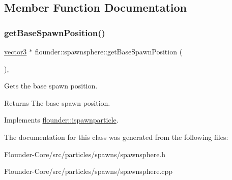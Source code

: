\subsection{Member Function Documentation}
\mbox{\label{classflounder_1_1spawnsphere_ac5ae227a5bff13da4e0fac4ba4debdd4}} 
\subsubsection{\texorpdfstring{get\+Base\+Spawn\+Position()}{getBaseSpawnPosition()}}
{\footnotesize\ttfamily \hyperlink{classflounder_1_1vector3}{vector3} $\ast$ flounder\+::spawnsphere\+::get\+Base\+Spawn\+Position (\begin{DoxyParamCaption}{ }\end{DoxyParamCaption})\hspace{0.3cm}{\ttfamily [override]}, {\ttfamily [virtual]}}



Gets the base spawn position. 

\begin{DoxyReturn}{Returns}
The base spawn position. 
\end{DoxyReturn}


Implements \hyperlink{classflounder_1_1ispawnparticle_a3e59019906bbb5ba8df82a4f6e847ef6}{flounder\+::ispawnparticle}.



The documentation for this class was generated from the following files\+:\begin{DoxyCompactItemize}
\item 
Flounder-\/\+Core/src/particles/spawns/spawnsphere.\+h\item 
Flounder-\/\+Core/src/particles/spawns/spawnsphere.\+cpp\end{DoxyCompactItemize}
